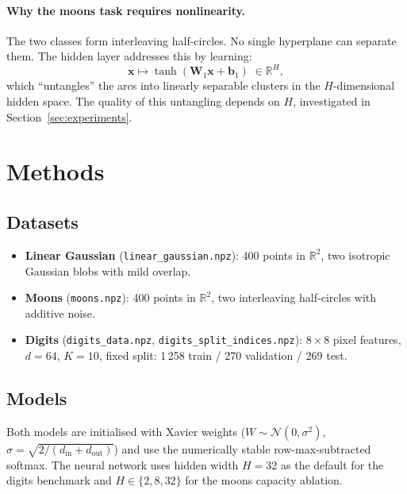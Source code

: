 \documentclass[sigconf,screen,nonacm]{acmart}
\newcommand{\R}{\mathbb{R}}
\newcommand{\1}{\mathbf{1}}
\newcommand{\tanhact}{\operatorname{tanh}}
\newcommand{\vx}{\mathbf{x}}
\newcommand{\vbone}{\mathbf{b}_1}
\newcommand{\mWone}{\mathbf{W}_1}
\begin{document}
\paragraph{Why the moons task requires nonlinearity.}
The two classes form interleaving half-circles.  No single hyperplane can
separate them.  The hidden layer addresses this by learning:
\begin{equation}
  \vx \mapsto \tanhact(\mWone\vx+\vbone)\;\in\R^H,
\end{equation}
which ``untangles'' the arcs into linearly separable clusters in the
$H$-dimensional hidden space.  The quality of this untangling depends on
$H$, investigated in Section~\ref{sec:experiments}.

\section{Methods}
\label{sec:methods}

\subsection{Datasets}
\begin{itemize}[leftmargin=*]
  \item \textbf{Linear Gaussian} (\texttt{linear\_gaussian.npz}): 400 points
        in $\R^2$, two isotropic Gaussian blobs with mild overlap.
  \item \textbf{Moons} (\texttt{moons.npz}): 400 points in $\R^2$, two
        interleaving half-circles with additive noise.
  \item \textbf{Digits} (\texttt{digits\_data.npz},
        \texttt{digits\_split\_indices.npz}): $8\times 8$ pixel features,
        $d{=}64$, $K{=}10$, fixed split: 1\,258 train / 270 validation /
        269 test.
\end{itemize}

\subsection{Models}
Both models are initialised with Xavier weights ($W\sim\mathcal{N}(0,\sigma^2)$,
$\sigma{=}\sqrt{2/(d_\text{in}+d_\text{out})}$) and use the numerically stable
row-max-subtracted softmax.  The neural network uses hidden width $H{=}32$ as
the default for the digits benchmark and $H\in\{2,8,32\}$ for the moons
capacity ablation.
\end{document}
